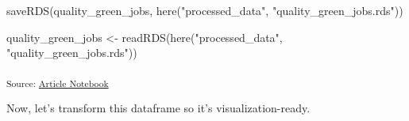 \documentclass[
  letterpaper,
  DIV=11,
  numbers=noendperiod]{scrartcl}
\newenvironment{Shaded}{\begin{snugshade}}{\end{snugshade}}
\newcommand{\FunctionTok}[1]{\textcolor[rgb]{0.28,0.35,0.67}{#1}}
\newcommand{\NormalTok}[1]{\textcolor[rgb]{0.00,0.23,0.31}{#1}}
\newcommand{\OtherTok}[1]{\textcolor[rgb]{0.00,0.23,0.31}{#1}}
\newcommand{\StringTok}[1]{\textcolor[rgb]{0.13,0.47,0.30}{#1}}
\begin{document}
\begin{Shaded}
\begin{Highlighting}[]
\FunctionTok{saveRDS}\NormalTok{(quality\_green\_jobs, }\FunctionTok{here}\NormalTok{(}\StringTok{"processed\_data"}\NormalTok{, }\StringTok{"quality\_green\_jobs.rds"}\NormalTok{))}

\NormalTok{quality\_green\_jobs }\OtherTok{\textless{}{-}} \FunctionTok{readRDS}\NormalTok{(}\FunctionTok{here}\NormalTok{(}\StringTok{"processed\_data"}\NormalTok{, }\StringTok{"quality\_green\_jobs.rds"}\NormalTok{))}
\end{Highlighting}
\end{Shaded}

\textsubscript{Source:
\href{https://beeckcenter.github.io/climate-equity-workforce/index-preview.html}{Article
Notebook}}

Now, let's transform this dataframe so it's visualization-ready.
\end{document}
